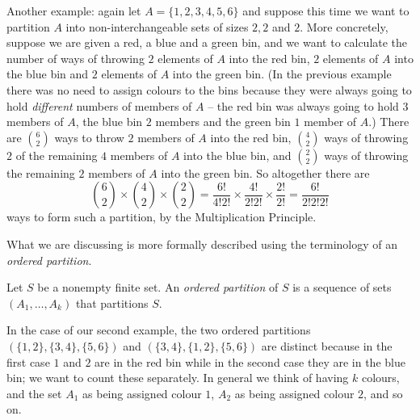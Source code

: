 \documentclass[11pt,dvipsnames]{book}
\numberwithin{equation}{section} %
\numberwithin{figure}{section} %
\numberwithin{table}{section} %
\begin{document}
Another example: again let $A = \{1,2,3,4,5,6\}$ and suppose this time we want to partition $A$ into non-interchangeable sets of sizes
$2, 2$ and $2$. More concretely, suppose we are given a red, a blue and a green bin, and we want to calculate the number of ways of throwing $2$ elements of $A$ into the red bin, $2$ elements of $A$ into the blue bin  and $2$ elements of $A$ into the green bin. (In the previous example there was no need to assign colours to the bins because they were always going to hold {\em different} numbers of members of $A$ -- the red bin was always going to hold $3$ members of $A$, the blue bin $2$ members and the green bin $1$ member of $A$.) There are $6 \choose 2$ ways to throw $2$ members of $A$ into the red bin,  $4\choose2$ ways of throwing $2$ of the remaining $4$ members of $A$ into the blue bin, and $2 \choose 2$ ways of throwing the remaining $2$ members of $A$ into the green bin. So altogether there are 
$$ {6 \choose 2} \times {4 \choose 2} \times {2 \choose 2}= \frac{6!}{4! 2!} \times \frac{4!}{2! 2!} \times \frac{2!}{2!} = \frac{6!}{2! 2! 2!}$$
ways to form such a partition, by the Multiplication Principle. 

What we are discussing is more formally described using the terminology of an {\em ordered partition}.

\begin{definition}\label{part}
Let $S$ be a nonempty finite set. 
An {\it ordered partition} of $S$ is a sequence of sets $(A_{1}, \dots ,A_{k})$ that partitions $S$. 
\end{definition}

In the case of our second example, the two ordered partitions $(\{1,2\}, \{3,4\}, \{5,6\})$ and
 $(\{3,4\}, \{1,2\}, \{5,6\})$ are distinct because
 in the first case $1$ and $2$ are in the red bin while in the second case they are in the blue bin; we want to count these separately. In general we think of having $k$ colours, and the set $A_1$ as being assigned colour $1$, $A_2$ as being assigned colour $2$, and so on.
 
 
 


\end{document}
